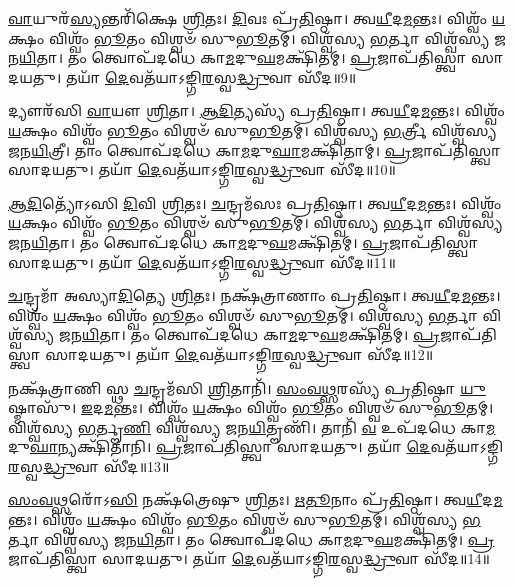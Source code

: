    \ul{𑌵𑌾}\-𑌯𑍁𑌰᳴\-\ul{𑌸𑍍𑌯}\-𑌨𑍍𑌤𑌰𑌿᳴𑌕𑍍𑌷𑍇 \ul{𑌶𑍍𑌰𑌿}\-𑌤𑌃।
   \ul{𑌦𑌿}\-𑌵𑌃 𑌪𑍍𑌰᳴\-\ul{𑌤𑌿}\-𑌷𑍍𑌠𑌾।
   𑌤𑍍𑌵\-\ul{𑌯𑍀}\-𑌦\-\ul{𑌮}\-𑌨𑍍𑌤𑌃।
   𑌵𑌿𑌶𑍍𑌵𑌂᳴ \ul{𑌯}\-𑌕𑍍𑌷𑌂 𑌵𑌿𑌶𑍍𑌵𑌂᳴ \ul{𑌭𑍂}\-𑌤𑌂 𑌵𑌿𑌶𑍍𑌵𑍞᳴ 𑌸𑍁\-\ul{𑌭𑍂}\-𑌤𑌮𑍍।
   𑌵𑌿𑌶𑍍𑌵᳴𑌸𑍍𑌯 \ul{𑌭}\-𑌰𑍍𑌤𑌾 𑌵𑌿𑌶𑍍𑌵᳴𑌸𑍍𑌯 𑌜𑌨\-\ul{𑌯𑌿}\-𑌤𑌾।
   𑌤𑌂 𑌤𑍍𑌵𑍋𑌪᳴𑌦𑌧𑍇 𑌕𑌾\-\ul{𑌮}\-𑌦𑍁\-\ul{𑌘}\-𑌮𑌕𑍍𑌷𑌿᳴𑌤𑌮𑍍।
   \ul{𑌪𑍍𑌰}\-𑌜𑌾𑌪᳴𑌤𑌿𑌸𑍍𑌤𑍍𑌵𑌾 𑌸𑌾𑌦𑌯𑌤𑍁।
   𑌤𑌯𑌾᳴ \ul{𑌦𑍇}\-𑌵𑌤᳴𑌯𑌾𑌽𑌙𑍍𑌗𑌿\-\ul{𑌰}\-𑌸𑍍𑌵\-\ul{𑌦𑍍𑌧𑍍𑌰𑍁}\-𑌵𑌾 𑌸𑍀᳴𑌦॥9॥

   𑌦𑍍𑌯𑍗𑌰᳴𑌸𑌿 \ul{𑌵𑌾}\-𑌯𑍗 \ul{𑌶𑍍𑌰𑌿}\-𑌤𑌾।
   \ul{𑌆}\-\-\ul{𑌦𑌿}\-𑌤𑍍𑌯𑌸𑍍𑌯᳴ 𑌪𑍍𑌰\-\ul{𑌤𑌿}\-𑌷𑍍𑌠𑌾।
   𑌤𑍍𑌵\-\ul{𑌯𑍀}\-𑌦\-\ul{𑌮}\-𑌨𑍍𑌤𑌃।
   𑌵𑌿𑌶𑍍𑌵𑌂᳴ \ul{𑌯}\-𑌕𑍍𑌷𑌂 𑌵𑌿𑌶𑍍𑌵𑌂᳴ \ul{𑌭𑍂}\-𑌤𑌂 𑌵𑌿𑌶𑍍𑌵𑍞᳴ 𑌸𑍁\-\ul{𑌭𑍂}\-𑌤𑌮𑍍।
   𑌵𑌿𑌶𑍍𑌵᳴𑌸𑍍𑌯 \ul{𑌭}\-𑌰𑍍𑌤𑍍𑌰𑍀 𑌵𑌿𑌶𑍍𑌵᳴𑌸𑍍𑌯 𑌜𑌨\-\ul{𑌯𑌿}\-𑌤𑍍𑌰𑍀।
   𑌤𑌾𑌂 𑌤𑍍𑌵𑍋𑌪᳴𑌦𑌧𑍇 𑌕𑌾\-\ul{𑌮}\-𑌦𑍁\-\ul{𑌘𑌾}\-𑌮𑌕𑍍𑌷𑌿᳴𑌤𑌾𑌮𑍍।
   \ul{𑌪𑍍𑌰}\-𑌜𑌾𑌪᳴𑌤𑌿𑌸𑍍𑌤𑍍𑌵𑌾 𑌸𑌾𑌦𑌯𑌤𑍁।
   𑌤𑌯𑌾᳴ \ul{𑌦𑍇}\-𑌵𑌤᳴𑌯𑌾𑌽𑌙𑍍𑌗𑌿\-\ul{𑌰}\-𑌸𑍍𑌵\-\ul{𑌦𑍍𑌧𑍍𑌰𑍁}\-𑌵𑌾 𑌸𑍀᳴𑌦॥10॥

   \ul{𑌆}\-\-\ul{𑌦𑌿}\-𑌤𑍍𑌯𑍋᳴𑌽𑌸𑌿 \ul{𑌦𑌿}\-𑌵𑌿 \ul{𑌶𑍍𑌰𑌿}\-𑌤𑌃।
   \ul{𑌚}\-𑌨𑍍𑌦𑍍𑌰𑌮᳴𑌸𑌃 𑌪𑍍𑌰\-\ul{𑌤𑌿}\-𑌷𑍍𑌠𑌾।
   𑌤𑍍𑌵\-\ul{𑌯𑍀}\-𑌦\-\ul{𑌮}\-𑌨𑍍𑌤𑌃।
   𑌵𑌿𑌶𑍍𑌵𑌂᳴ \ul{𑌯}\-𑌕𑍍𑌷𑌂 𑌵𑌿𑌶𑍍𑌵𑌂᳴ \ul{𑌭𑍂}\-𑌤𑌂 𑌵𑌿𑌶𑍍𑌵𑍞᳴ 𑌸𑍁\-\ul{𑌭𑍂}\-𑌤𑌮𑍍।
   𑌵𑌿𑌶𑍍𑌵᳴𑌸𑍍𑌯 \ul{𑌭}\-𑌰𑍍𑌤𑌾 𑌵𑌿𑌶𑍍𑌵᳴𑌸𑍍𑌯 𑌜𑌨\-\ul{𑌯𑌿}\-𑌤𑌾।
   𑌤𑌂 𑌤𑍍𑌵𑍋𑌪᳴𑌦𑌧𑍇 𑌕𑌾\-\ul{𑌮}\-𑌦𑍁\-\ul{𑌘}\-𑌮𑌕𑍍𑌷𑌿᳴𑌤𑌮𑍍।
   \ul{𑌪𑍍𑌰}\-𑌜𑌾𑌪᳴𑌤𑌿𑌸𑍍𑌤𑍍𑌵𑌾 𑌸𑌾𑌦𑌯𑌤𑍁।
   𑌤𑌯𑌾᳴ \ul{𑌦𑍇}\-𑌵𑌤᳴𑌯𑌾𑌽𑌙𑍍𑌗𑌿\-\ul{𑌰}\-𑌸𑍍𑌵\-\ul{𑌦𑍍𑌧𑍍𑌰𑍁}\-𑌵𑌾 𑌸𑍀᳴𑌦॥11॥

   \ul{𑌚}\-𑌨𑍍𑌦𑍍𑌰𑌮𑌾᳴ 𑌅𑌸𑍍𑌯𑌾\-\ul{𑌦𑌿}\-𑌤𑍍𑌯𑍇 \ul{𑌶𑍍𑌰𑌿}\-𑌤𑌃।
   𑌨𑌕𑍍𑌷᳴𑌤𑍍𑌰𑌾𑌣𑌾𑌂 𑌪𑍍𑌰\-\ul{𑌤𑌿}\-𑌷𑍍𑌠𑌾।
   𑌤𑍍𑌵\-\ul{𑌯𑍀}\-𑌦\-\ul{𑌮}\-𑌨𑍍𑌤𑌃।
   𑌵𑌿𑌶𑍍𑌵𑌂᳴ \ul{𑌯}\-𑌕𑍍𑌷𑌂 𑌵𑌿𑌶𑍍𑌵𑌂᳴ \ul{𑌭𑍂}\-𑌤𑌂 𑌵𑌿𑌶𑍍𑌵𑍞᳴ 𑌸𑍁\-\ul{𑌭𑍂}\-𑌤𑌮𑍍।
   𑌵𑌿𑌶𑍍𑌵᳴𑌸𑍍𑌯 \ul{𑌭}\-𑌰𑍍𑌤𑌾 𑌵𑌿𑌶𑍍𑌵᳴𑌸𑍍𑌯 𑌜𑌨\-\ul{𑌯𑌿}\-𑌤𑌾।
   𑌤𑌂 𑌤𑍍𑌵𑍋𑌪᳴𑌦𑌧𑍇 𑌕𑌾\-\ul{𑌮}\-𑌦𑍁\-\ul{𑌘}\-𑌮𑌕𑍍𑌷𑌿᳴𑌤𑌮𑍍।
   \ul{𑌪𑍍𑌰}\-𑌜𑌾𑌪᳴𑌤𑌿𑌸𑍍𑌤𑍍𑌵𑌾 𑌸𑌾𑌦𑌯𑌤𑍁।
   𑌤𑌯𑌾᳴ \ul{𑌦𑍇}\-𑌵𑌤᳴𑌯𑌾𑌽𑌙𑍍𑌗𑌿\-\ul{𑌰}\-𑌸𑍍𑌵\-\ul{𑌦𑍍𑌧𑍍𑌰𑍁}\-𑌵𑌾 𑌸𑍀᳴𑌦॥12॥

   𑌨𑌕𑍍𑌷᳴𑌤𑍍𑌰𑌾𑌣𑌿 𑌸𑍍𑌥 \ul{𑌚}\-𑌨𑍍𑌦𑍍𑌰𑌮᳴𑌸𑌿 \ul{𑌶𑍍𑌰𑌿}\-𑌤𑌾𑌨𑌿᳴।
   \ul{𑌸𑌂}\-\-\ul{𑌵}\-\-\ul{𑌥𑍍𑌸}\-𑌰𑌸𑍍𑌯᳴ 𑌪𑍍𑌰\-\ul{𑌤𑌿}\-𑌷𑍍𑌠𑌾 \ul{𑌯𑍁}\-𑌷𑍍𑌮𑌾𑌸𑍁᳴। 
   \ul{𑌇}\-𑌦\-\ul{𑌮}\-𑌨𑍍𑌤𑌃।
   𑌵𑌿𑌶𑍍𑌵𑌂᳴ \ul{𑌯}\-𑌕𑍍𑌷𑌂 𑌵𑌿𑌶𑍍𑌵𑌂᳴ \ul{𑌭𑍂}\-𑌤𑌂 𑌵𑌿𑌶𑍍𑌵𑍞᳴ 𑌸𑍁\-\ul{𑌭𑍂}\-𑌤𑌮𑍍।
   𑌵𑌿𑌶𑍍𑌵᳴𑌸𑍍𑌯 \ul{𑌭}\-𑌰𑍍𑌤𑍄\-\ul{𑌣𑌿} 𑌵𑌿𑌶𑍍𑌵᳴𑌸𑍍𑌯 𑌜𑌨\-\ul{𑌯𑌿}\-𑌤𑍄𑌣𑌿᳴।
   𑌤𑌾𑌨𑌿᳴ \ul{𑌵} 𑌉𑌪᳴𑌦𑌧𑍇 𑌕𑌾\-\ul{𑌮}\-𑌦𑍁\-\ul{𑌘𑌾}\-𑌨𑍍𑌯𑌕𑍍𑌷𑌿᳴𑌤𑌾𑌨𑌿।
   \ul{𑌪𑍍𑌰}\-𑌜𑌾𑌪᳴𑌤𑌿𑌸𑍍𑌤𑍍𑌵𑌾 𑌸𑌾𑌦𑌯𑌤𑍁।
   𑌤𑌯𑌾᳴ \ul{𑌦𑍇}\-𑌵𑌤᳴𑌯𑌾𑌽𑌙𑍍𑌗𑌿\-\ul{𑌰}\-𑌸𑍍𑌵\-\ul{𑌦𑍍𑌧𑍍𑌰𑍁}\-𑌵𑌾 𑌸𑍀᳴𑌦॥13॥

   \ul{𑌸𑌂}\-\-\ul{𑌵}\-\-\ul{𑌥𑍍𑌸}\-𑌰𑍋᳴𑌽\-\ul{𑌸𑌿} 𑌨𑌕𑍍𑌷᳴𑌤𑍍𑌰𑍇𑌷𑍁 \ul{𑌶𑍍𑌰𑌿}\-𑌤𑌃।
   \ul{𑌋}\-\-\ul{𑌤𑍂}\-𑌨𑌾𑌂 𑌪𑍍𑌰᳴\-\ul{𑌤𑌿}\-𑌷𑍍𑌠𑌾। 
   𑌤𑍍𑌵\-\ul{𑌯𑍀}\-𑌦\-\ul{𑌮}\-𑌨𑍍𑌤𑌃।
   𑌵𑌿𑌶𑍍𑌵𑌂᳴ \ul{𑌯}\-𑌕𑍍𑌷𑌂 𑌵𑌿𑌶𑍍𑌵𑌂᳴ \ul{𑌭𑍂}\-𑌤𑌂 𑌵𑌿𑌶𑍍𑌵𑍞᳴ 𑌸𑍁\-\ul{𑌭𑍂}\-𑌤𑌮𑍍।
   𑌵𑌿𑌶𑍍𑌵᳴𑌸𑍍𑌯 \ul{𑌭}\-𑌰𑍍𑌤𑌾 𑌵𑌿𑌶𑍍𑌵᳴𑌸𑍍𑌯 𑌜𑌨\-\ul{𑌯𑌿}\-𑌤𑌾।
   𑌤𑌂 𑌤𑍍𑌵𑍋𑌪᳴𑌦𑌧𑍇 𑌕𑌾\-\ul{𑌮}\-𑌦𑍁\-\ul{𑌘}\-𑌮𑌕𑍍𑌷𑌿᳴𑌤𑌮𑍍।
   \ul{𑌪𑍍𑌰}\-𑌜𑌾𑌪᳴𑌤𑌿𑌸𑍍𑌤𑍍𑌵𑌾 𑌸𑌾𑌦𑌯𑌤𑍁।
   𑌤𑌯𑌾᳴ \ul{𑌦𑍇}\-𑌵𑌤᳴𑌯𑌾𑌽𑌙𑍍𑌗𑌿\-\ul{𑌰}\-𑌸𑍍𑌵\-\ul{𑌦𑍍𑌧𑍍𑌰𑍁}\-𑌵𑌾 𑌸𑍀᳴𑌦॥14॥

